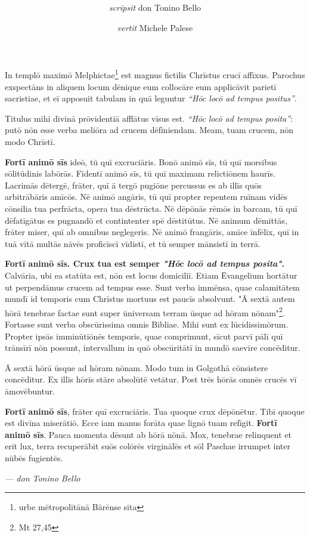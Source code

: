 \documentclass[a4paper, 11pt]{article}
\title{
	\Huge{\MyTitle}
}
\author{
	\textit{scrīpsit} don Tonino Bello \and \textit{vertit} Michele Palese
}
\date{}
\begin{document}
	\maketitle
	
	In templō maximō Melphictae\footnote{urbe mētropolītānā Bārēnse sita} est magnus fictilis Chrīstus crucī affīxus.
	Parochus exspectāns in aliquem locum dēnique eum collocāre eum applicāvit parietī sacristiae, et eī apposuit tabulam in quā leguntur \textit{``Hōc locō ad tempus positus''}.
	
	Titulus mihi divinā prōvidentiā afflātus vīsus est.
	\textit{``Hōc locō ad tempus posita''}: putō nōn esse verba meliōra ad crucem dēfīniendam.
	Meam, tuam crucem, nōn modo Chrīstī.
	
	\textbf{Fortī animō sīs} ideō, tū quī excruciāris.
	Bonō animō sīs, tū quī morsibus sōlitūdinis labōrās.
	Fīdentī animō sīs, tū quī maximam relictiōnem haurīs.
	Lacrimās dētergē, frāter, quī ā tergō pugiōne percussus es ab illīs quōs arbitrābāris amīcōs.
	Nē animō angāris, tū quī propter repentem ruīnam vidēs cōnsilia tua perfrācta, opera tua dēstrūcta.
	Nē dēpōnās rēmōs in barcam, tū quī dēfatīgātus es pugnandō et contintenter spē dēstitūtus.
	Nē animum dēmittās, frāter miser, quī ab omnibus neglegeris.
	Nē animō frangāris, amīce īnfēlix, quī in tuā vītā multās nāvēs proficīscī vīdistī, et tū semper mānsistī in terrā.
	
	\textbf{Fortī animō sīs. Crux tua est semper \textit{"Hōc locō ad tempus posita"}.}
	Calvāria, ubi ea statūta est, nōn est locus domiciliī. Etiam Ēvangelium
	hortātur ut perpendāmus crucem ad tempus esse. Sunt verba immēnsa, quae
	calamitātem mundī id temporis cum Chrīstus mortuus est paucīs absolvunt.
	"Ā sextā autem hōrā tenebrae factae sunt super ūniversam terram ūsque
	ad hōram nōnam"\footnote{Mt 27,45}. Fortasse sunt verba obscūrissima omnis Bibliae.
	Mihi sunt ex lūcidissimōrum. Propter ipsās imminūtiōnēs temporis, quae
	comprimunt, sīcut parvī pālī quī trānsīrī nōn possunt, intervallum in
	quō obscūritātī in mundō saevīre concēditur.
	
	Ā sextā hōrā ūsque ad hōram nōnam. Modo tum in Golgothā cōnsistere
	concēditur. Ex illīs hōrīs stāre absolūtē vetātur. Post trēs hōrās omnēs
	crucēs vī āmovēbuntur.
	
	\textbf{Fortī animō sīs}, frāter quī excruciāris.
	Tua quoque crux dēpōnētur.
	Tibī quoque est divīna miserātiō.
	Ecce iam manus forāta quae lignō tuam refīgit.
	\textbf{Fortī animō sīs}.
	Pauca momenta dēsunt ab hōrā nōnā.
	Mox, tenebrae relinquent et erit lux, terra recuperābit suōs colōrēs virginālēs et sōl Paschae irrumpet inter nūbēs fugientēs.
	
	\bigskip
	
	\raggedleft \textit{--- don Tonino Bello} \hspace{1em}
\end{document}
